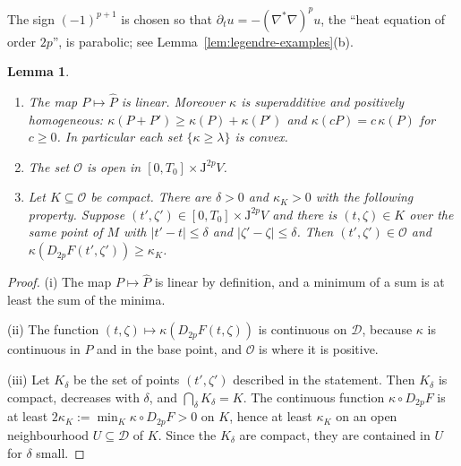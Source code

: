 \documentclass[11pt,reqno]{amsart}
\newtheorem{lemma}[theorem]{Lemma}
\theoremstyle{definition}
\theoremstyle{remark}
\newcommand{\Dom}{\mathcal{D}}
\newcommand{\Par}{\mathcal{O}}
\newcommand{\Jet}{\mathrm{J}}
\newcommand{\abs}[1]{\lvert #1\rvert}
\newcommand{\Lap}{\nabla^{*}\nabla}
\newcommand{\hatP}{\widehat{P}}
\newcommand{\lean}[1]{}
\newcommand{\uses}[1]{}
\numberwithin{equation}{section}
\begin{document}
The sign $(-1)^{p+1}$ is chosen so that $\partial_tu=-(\Lap)^pu$, the ``heat equation of order
$2p$'', is parabolic; see Lemma~\ref{lem:legendre-examples}(b).

\begin{lemma}\label{lem:legendre-basic}
\lean{ShortTime.legendreForm_add, ShortTime.legendreForm_smul, ShortTime.LegendreAt.combo, ShortTime.isOpen_parabolicDomain, ShortTime.legendre_tube}
\uses{def:legendre}
\begin{enumerate}[label=(\roman*),nosep]
\item The map $P\mapsto\hatP$ is linear. Moreover $\kappa$ is superadditive and positively
  homogeneous: $\kappa(P+P')\ge\kappa(P)+\kappa(P')$ and $\kappa(cP)=c\,\kappa(P)$ for $c\ge0$. In
  particular each set $\{\kappa\ge\lambda\}$ is convex.
\item The set $\Par$ is open in $[0,T_0]\times\Jet^{2p}V$.
\item Let $K\subseteq\Par$ be compact. There are $\delta>0$ and $\kappa_K>0$ with the following
  property. Suppose $(t',\zeta')\in[0,T_0]\times\Jet^{2p}V$ and there is $(t,\zeta)\in K$ over the same
  point of $M$ with $\abs{t'-t}\le\delta$ and $\abs{\zeta'-\zeta}\le\delta$. Then
  $(t',\zeta')\in\Par$ and $\kappa(D_{2p}F(t',\zeta'))\ge\kappa_K$.
\end{enumerate}
\end{lemma}

\begin{proof}
(i) The map $P\mapsto\hatP$ is linear by definition, and a minimum of a sum is at least the sum of the
minima.

(ii) The function $(t,\zeta)\mapsto\kappa(D_{2p}F(t,\zeta))$ is continuous on $\Dom$, because $\kappa$
is continuous in $P$ and in the base point, and $\Par$ is where it is positive.

(iii) Let $K_\delta$ be the set of points $(t',\zeta')$ described in the statement. Then $K_\delta$ is
compact, decreases with $\delta$, and $\bigcap_\delta K_\delta=K$. The continuous function
$\kappa\circ D_{2p}F$ is at least $2\kappa_K:=\min_K\kappa\circ D_{2p}F>0$ on $K$, hence at least
$\kappa_K$ on an open neighbourhood $U\subseteq\Dom$ of $K$. Since the $K_\delta$ are compact, they are
contained in $U$ for $\delta$ small.
\end{proof}
\end{document}
